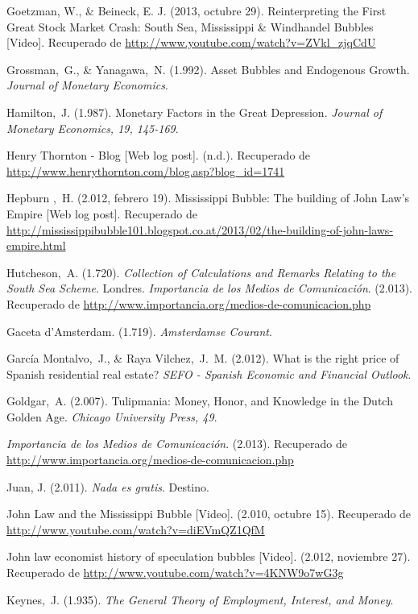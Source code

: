 \begin{thebibliography}{11}
	\bibitem{}
		Goetzman, W., \& Beineck, E. J. (2013, octubre 29). Reinterpreting the First Great Stock Market Crash: South Sea, Mississippi \& Windhandel Bubbles [Video]. Recuperado de \url{http://www.youtube.com/watch?v=ZVkl\_zjqCdU}

	\bibitem{}
		Grossman, G., \& Yanagawa, N. (1.992). Asset Bubbles and Endogenous Growth. \emph{Journal of Monetary Economics}. 

	\bibitem{}
		Hamilton, J. (1.987). Monetary Factors in the Great Depression. \emph{Journal of Monetary Economics, 19, 145-169}. 

	\bibitem{}
		Henry Thornton - Blog [Web log post]. (n.d.). Recuperado de \url{http://www.henrythornton.com/blog.asp?blog\_id=1741}

	\bibitem{}
		Hepburn , H. (2.012, febrero 19). Mississippi Bubble: The building of John Law’s Empire [Web log post]. Recuperado de \url{http://mississippibubble101.blogspot.co.at/2013/02/the-building-of-john-laws-empire.html}

	\bibitem{}
		Hutcheson, A. (1.720). \emph{Collection of Calculations and Remarks Relating to the South Sea Scheme}. Londres.	
	\bibitem{}
		\emph{Importancia de los Medios de Comunicación}. (2.013). Recuperado de \url{http://www.importancia.org/medios-de-comunicacion.php}

	\bibitem{}
		Gaceta d'Amsterdam. (1.719). \emph{Amsterdamse Courant}.  	

	\bibitem{}
		García Montalvo, J., \& Raya Vilchez, J. M. (2.012). What is the right price of Spanish residential real estate? \emph{SEFO - Spanish Economic and Financial Outlook}. 

	\bibitem{}
		Goldgar, A. (2.007). Tulipmania: Money, Honor, and Knowledge in the Dutch Golden Age. \emph{Chicago University Press, 49}. 	

	\bibitem{}
		\emph{Importancia de los Medios de Comunicación}. (2.013). Recuperado de \url{http://www.importancia.org/medios-de-comunicacion.php}

	\bibitem{}
		Juan, J. (2.011). \emph{Nada es gratis}. Destino. 

	\bibitem{}
		John Law and the Mississippi Bubble [Video]. (2.010, octubre 15). Recuperado de \url{http://www.youtube.com/watch?v=diEVmQZ1QfM}

	\bibitem{}
		John law economist history of speculation bubbles [Video]. (2.012, noviembre 27). Recuperado de \url{http://www.youtube.com/watch?v=4KNW9o7wG3g}

	\bibitem{}
		Keynes, J. (1.935). \emph{The General Theory of Employment, Interest, and Money}.


\end{thebibliography}
